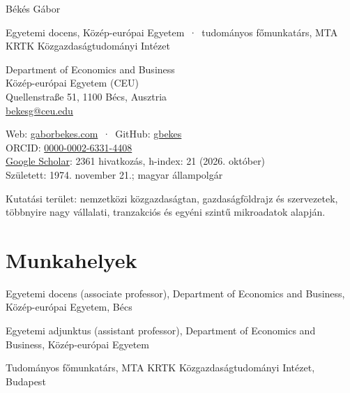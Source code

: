 \documentclass[10pt,a4paper]{article}
\begin{document}
{\fontsize{22}{26}\selectfont\color{accent} Békés Gábor}\par
\vspace{0.6ex}
{\color{muted}Egyetemi docens, Közép-európai Egyetem \,·\, tudományos főmunkatárs, MTA KRTK Közgazdaságtudományi Intézet}\par
\vspace{1.2ex}
\begin{minipage}[t]{0.52\textwidth}
\small
Department of Economics and Business\\
Közép-európai Egyetem (CEU)\\
Quellenstraße 51, 1100 Bécs, Ausztria\\
\href{mailto:bekesg@ceu.edu}{bekesg@ceu.edu}
\end{minipage}%
\begin{minipage}[t]{0.48\textwidth}
\small
Web: \href{https://gaborbekes.com}{gaborbekes.com} \,·\, GitHub: \href{https://github.com/gbekes}{gbekes}\\
ORCID: \href{https://orcid.org/0000-0002-6331-4408}{0000-0002-6331-4408}\\
\href{https://scholar.google.com/citations?user=Yk5xy7EAAAAJ}{Google Scholar}: 2361 hivatkozás, h-index: 21 (2026. október)\\
Született: 1974. november 21.; magyar állampolgár
\end{minipage}

\vspace{1.2ex}
{\small Kutatási terület: nemzetközi közgazdaságtan, gazdaságföldrajz és szervezetek, többnyire nagy
vállalati, tranzakciós és egyéni szintű mikroadatok alapján.}

\section{Munkahelyek}
\begin{cvlist}
  \item[2023--] Egyetemi docens (associate professor), Department of Economics and Business, Közép-európai Egyetem, Bécs
  \item[2017--2023] Egyetemi adjunktus (assistant professor), Department of Economics and Business, Közép-európai Egyetem
  \item[2005--] Tudományos főmunkatárs, MTA KRTK Közgazdaságtudományi Intézet, Budapest
\end{cvlist}
\end{document}
